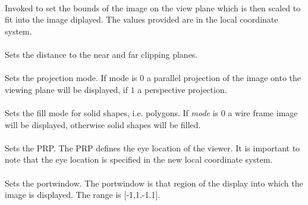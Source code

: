 \\
Invoked to set the bounds of the image on the view plane which is then
scaled to fit into the image diplayed. The values provided are in the
local coordinate system. \\

\\
Sets the distance to the near and far clipping planes. \\

\\ 
Sets the projection mode. If mode is $0$ a parallel projection of the
image onto the viewing plane will be displayed, if $1$ a perspective
projection. \\

\\
Sets the fill mode for solid shapes, i.e. polygons. If {\em mode} is
$0$ a wire frame image will be displayed, otherwise solid shapes will
be filled. \\

\\
Sets the PRP. The PRP defines the eye location of the viewer. It is
important to note that the eye location is specified in the new local
coordinate system. \\

\\ 
Sets the portwindow. The portwindow is that region of the display
into which the image is displayed. The range is [-1,1.-1.1]. \\